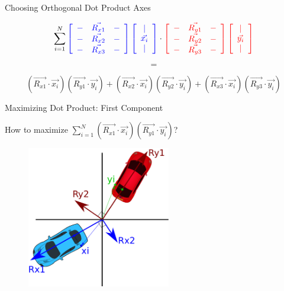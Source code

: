 \documentclass{beamer}
\begin{document}
\begin{frame}{Choosing Orthogonal Dot Product Axes}

\[ \sum_{i = 1}^N \textcolor{blue}{ \left[  \begin{array}{ccc} - & \vec{R_{x1}} & - \\ - & \vec{R_{x2}} & - \\ - & \vec{R_{x3}} & - \end{array} \right]  \left[ \begin{array}{c}  | \\ 
\vec{x_i} \\ |  \end{array} \right]  } \cdot \textcolor{red}{ \left[  \begin{array}{ccc} - & \vec{R_{y1}} & - \\ - & \vec{R_{y2}} & - \\ - & \vec{R_{y3}} & - \end{array} \right]  \left[ \begin{array}{c}  | \\ 
\vec{y_i} \\ |  \end{array} \right]   } \]

\[ = \]

\[ (\vec{R_{x1}} \cdot \vec{x_i})(\vec{R_{y1}} \cdot \vec{y_i}) + (\vec{R_{x2}} \cdot \vec{x_i})(\vec{R_{y2}} \cdot \vec{y_i}) + (\vec{R_{x3}} \cdot \vec{x_i})(\vec{R_{y3}} \cdot \vec{y_i})\]

\end{frame}

\begin{frame}{Maximizing Dot Product: First Component}

How to maximize $\sum_{i=1}^N  (\vec{R_{x1}} \cdot \vec{x_i})(\vec{R_{y1}} \cdot \vec{y_i})$?

\begin{figure}[t]
	\centering
    \includegraphics[width=0.56\textwidth]{CarRotAxesPointProj.pdf}
\end{figure}


\end{frame}
\end{document}
